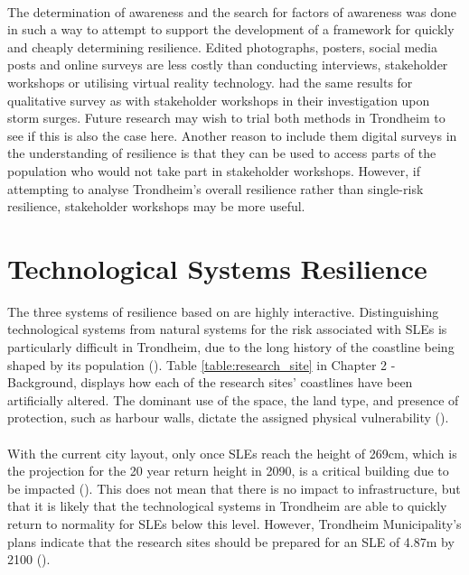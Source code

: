 \paragraph{}
The determination of awareness and the search for factors of awareness was done in such a way to attempt to support the development of a framework for quickly and cheaply determining resilience. Edited photographs, posters, social media posts and online surveys are less costly than conducting interviews, stakeholder workshops or utilising virtual reality technology. \cite{gerkensmeier_governing_2018} had the same results for qualitative survey as with stakeholder workshops in their investigation upon storm surges. Future research may wish to trial both methods in Trondheim to see if this is also the case here. Another reason to include them digital surveys in the understanding of resilience is that they can be used to access parts of the population who would not take part in stakeholder workshops. However, if attempting to analyse Trondheim's overall resilience rather than single-risk resilience, stakeholder workshops may be more useful.


\section{Technological Systems Resilience}\label{tech-resilience-discussion}
The three systems of resilience based on \cite{cutter_place-based_2008} are highly interactive. Distinguishing technological systems from natural systems for the risk associated with SLEs is particularly difficult in Trondheim, due to the long history of the coastline being shaped by its population (\cite{sjavik_z_2010}). Table \ref{table:research_site} in Chapter 2 - Background, displays how each of the research sites' coastlines have been artificially altered. The dominant use of the space, the land type, and presence of protection, such as harbour walls, dictate the assigned physical vulnerability (\cite{opach_seeking_2020}).
\paragraph{}

With the current city layout, only once SLEs reach the height of 269cm, which is the projection for the 20 year return height in 2090, is a critical building due to be impacted (\cite{kartverket_se_2021}). This does not mean that there is no impact to infrastructure, but that it is likely that the technological systems in Trondheim are able to quickly return to normality for SLEs below this level. However, Trondheim Municipality's plans indicate that the research sites should be prepared for an SLE  of 4.87m by 2100 (\cite{hanssen_saksframlegg_2013}).
